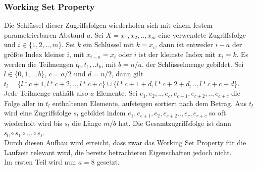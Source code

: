 \documentclass[a4paper,12pt]{article}
\begin{document}
\subsubsection{Working Set Property} \label{testWork}
Die Schlüssel dieser Zugriffsfolgen wiederholen sich mit einem festem parametrierbaren Abstand $a$. 
Sei  $X = x_1, x_2,.., x_m$ eine verwendete Zugriffsfolge und $i \in \{1,2,..,m\}$. Sei $k$ ein Schlüssel mit $k = x_i$, dann ist entweder $i-a$ der größte Index kleiner $i$, mit $x_{i-a} = x_i$ oder $i$ ist der kleinste Index mit $x_i = k$. Es werden die Teilmengen $t_0, t_1,.. t_b$, mit $b = n / a$, der  Schlüsselmenge gebildet. Sei $l \in \{0, 1,.., b\}$, $c = a/2$ und $d = n /2$, dann gilt \\ $t_l = \{l * c + 1, l * c + 2,.., l * c + c\} \cup \{l * c + 1 + d, l * c + 2 + d,.., l * c + c + d\}$. Jede Teilmenge enthält also $a$ Elemente. Sei $e_1, e_2,.., e_c, e_{c+1}, e_{c+2},.., e_{c+c} $ die Folge aller in $t_l$ enthaltenen Elemente, aufsteigen sortiert nach dem Betrag. Aus $t_l$ wird eine Zugriffsfolge $s_l$ gebildet indem  $e_1, e_{c+1}, e_2,e_{c+2}.., e_c, e_{c + c}$ so oft wiederholt wird bis $s_l$ die Länge $m/b$ hat. Die Gesamtzugriffsfolge ist dann $s_0 \circ s_1 \circ...\circ s_l$. \\
Durch diesen Aufbau wird erreicht, dass zwar das Working Set Property für die Laufzeit relevant wird, die bereits betrachteten Eigenschaften jedoch nicht.\\
Im ersten Teil wird nun $a = 8$ gesetzt.
\end{document}
